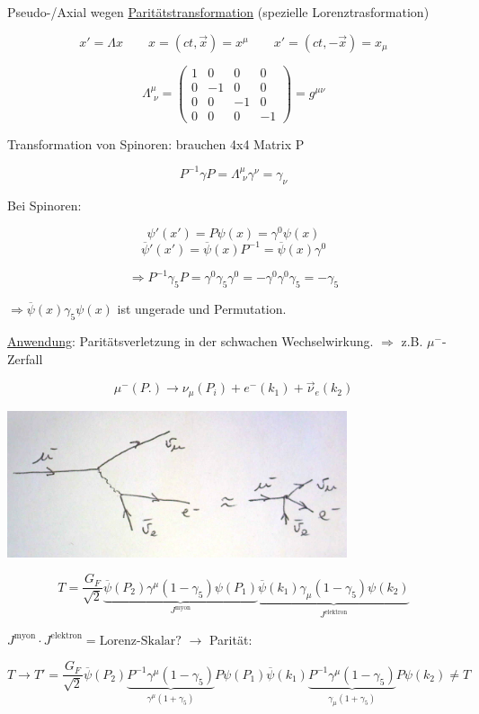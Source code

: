Pseudo-/Axial wegen \underline{Paritätstransformation} (spezielle Lorenztrasformation)

\[x' = \Lambda x \qquad x=(ct,\vec x) = x^\mu  \qquad x'=(ct,-\vec x) = x_\mu  \]

\[\Lambda^\mu_{\,\,\nu} = \begin{pmatrix} 1&0&0&0\\   0&-1&0&0\\  0&0&-1&0\\   0&0&0&-1 \end{pmatrix} = g^{\mu\nu} \]

Transformation von Spinoren: brauchen 4x4 Matrix P

\[P^{-1}\gamma P = \Lambda^\mu_{\,\,\nu}\gamma^\nu = \gamma_\nu\]


Bei Spinoren:

\[\psi'(x') = P\psi(x) = \gamma^0\psi(x) \]
\[\overline \psi'(x') = \overline\psi(x)P^{-1} = \overline \psi(x) \gamma^0 \]


\[\Rightarrow P^{-1}\gamma_5 P = \gamma^0\gamma_5\gamma^0 = -\gamma^0\gamma^0\gamma_5 = -\gamma_5\]

\(\Rightarrow \overline\psi(x) \gamma_5\psi(x)\) ist ungerade und Permutation.

\underline{Anwendung}: Paritätsverletzung in der schwachen Wechselwirkung. \(\Rightarrow \) z.B. \(\mu^-\)-Zerfall

\[\mu^-(P.) \rightarrow \nu_\mu(P_i) + e^-(k_1) + \vec \nu_e(k_2)\]


 \includegraphics[width=0.75\textwidth]{kap06_01.png}


\[T= \frac{G_F}{\sqrt{2}}\underbrace{  \overline\psi(P_2)\gamma^\mu(1-\gamma_5)\psi(P_1)}_{J^{\text{myon}}} \underbrace{\overline\psi(k_1)\gamma_\mu(1-\gamma_5)\psi(k_2)}_{J^{\text{elektron}}}\]


\(J^{\text{myon}}\cdot J^{\text{elektron}} = \text{Lorenz-Skalar?}\) \(\rightarrow \) Parität:

\[T\rightarrow T' =\frac{G_F}{\sqrt{2}} \overline\psi(P_2)\underbrace{P^{-1}\gamma^\mu(1-\gamma_5)}_{\gamma^\mu (1+\gamma_5)} P \psi(P_1)   \overline\psi(k_1)\underbrace{P^{-1}\gamma^\mu(1-\gamma_5)}_{\gamma_\mu (1+\gamma_5)} P \psi(k_2) \neq T\]

